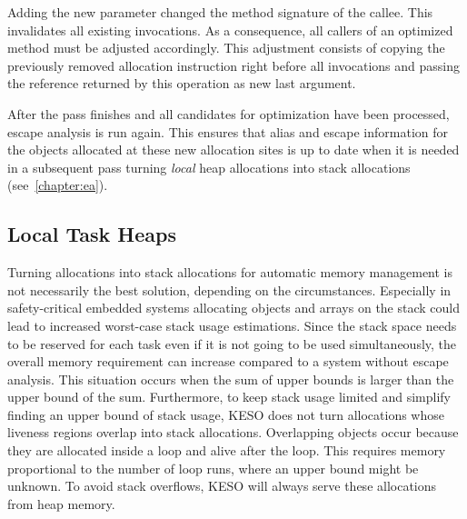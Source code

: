			Adding the new parameter changed the method signature of the callee. This invalidates all existing invocations. As
			a consequence, all callers of an optimized method must be adjusted accordingly. This adjustment consists of
			copying the previously removed allocation instruction right before all invocations and passing the reference
			returned by this operation as new last argument.

			After the pass finishes and all candidates for optimization have been processed, escape analysis is run again.
			This ensures that alias and escape information for the objects allocated at these new allocation sites is up to
			date when it is needed in a subsequent pass turning \emph{local} heap allocations into stack allocations
			(see~\cref{chapter:ea}).

		\subsection{Local Task Heaps}
			\label{sub:eea:opt:ldh}
			Turning allocations into stack allocations for automatic memory management is not necessarily the best solution,
			depending on the circumstances. Especially in safety-critical embedded systems allocating objects and arrays on
			the stack could lead to increased worst-case stack usage estimations. Since the stack space needs to be reserved
			for each task even if it is not going to be used simultaneously, the overall memory requirement can increase
			compared to a system without escape analysis. This situation occurs when the sum of upper bounds is larger than
			the upper bound of the sum. Furthermore, to keep stack usage limited and simplify finding an upper bound of stack
			usage, KESO does not turn allocations whose liveness regions overlap into stack allocations. Overlapping objects
			occur because they are allocated inside a loop and alive after the loop. This requires memory proportional to the
			number of loop runs, where an upper bound might be unknown. To avoid stack overflows, KESO will always serve these
			allocations from heap memory.

